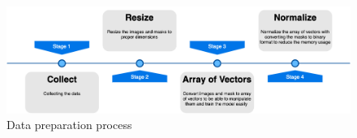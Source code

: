 \begin{figure}
    \centerline{\includegraphics[width=1\columnwidth]{04-methodology/figures/data-preparation-process.png}}
    \caption{Data preparation process}
    \label{figure:data-preparation-process}
\end{figure}